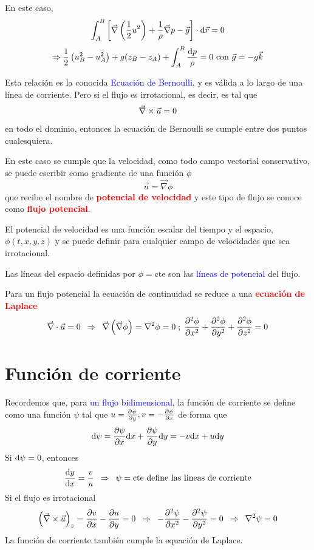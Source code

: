 	
	En este caso, 
	\[
	\int_{A}^{B}\left[\vec{\nabla}\left(\frac{1}{2}u^{2}\right)+\frac{1}{\rho}\vec{\nabla}p-\vec{g}\right]\cdot\text{d}\vec{r}=0
	\]
	\[
	\Rightarrow\frac{1}{2}\left(u_{B}^{2}-u_{A}^{2}\right)+g(z_{B}-z_{A})+\int_{A}^{B}\frac{\text{d} p}{\rho}=0\textrm{ con }\vec{g}=-g\vec{k}
	\]
	
	Esta relación es la conocida \textcolor{blue}{Ecuación de Bernoulli},
	y es válida a lo largo de una línea de corriente. Pero si el flujo
	es irrotacional, es decir, es tal que 
	\[
	\vec \nabla \times\vec{u}=0
	\]
	en todo el dominio, entonces la ecuación de Bernoulli se cumple entre
	dos puntos cualesquiera.

	
	En este caso se cumple que la velocidad, como todo campo vectorial
	conservativo, se puede escribir como gradiente de una función $\phi$
	\[
	\vec{u}=\vec{\nabla}\phi
	\]
	que recibe el nombre de \textbf{\textcolor{red}{potencial de velocidad}}
	y este tipo de flujo se conoce como \textbf{\textcolor{red}{flujo
			potencial}}.
	
	El potencial de velocidad es una función escalar del tiempo y el espacio,
	$\phi(t,x,y,z)$ y se puede definir para cualquier campo de velocidades
	que sea irrotacional.
	
	Las líneas del espacio definidas por $\phi=\text{cte}$ son las \textcolor{blue}{líneas
		de potencial} del flujo.
	
	Para un flujo potencial la ecuación de continuidad se reduce a una
	\textbf{\textcolor{red}{ecuación de Laplace}} 
	\[
	\vec{\nabla}\cdot\vec{u}=0\enskip\Rightarrow\enskip\vec{\nabla}\left(\vec{\nabla}\phi\right)=\nabla^{2}\phi=0\;;\;\frac{\partial^2 \phi}{\partial x^2}+\frac{\partial^2 \phi}{\partial y^2}+\frac{\partial^2 \phi}{\partial z^2}=0
	\]
	

\section{Función de corriente}

	
	Recordemos que, para \textcolor{blue}{un flujo bidimensional}, la
	función de corriente se define como una función $\psi$ tal que $u=\frac{\partial \psi}{\partial y},v=-\frac{\partial \psi}{\partial x}$
	de forma que 
	\[
	\text{d}\psi=\frac{\partial \psi}{\partial x}\text{d} x+\frac{\partial \psi}{\partial y}\text{d} y=-v\text{d} x+u\text{d} y
	\]
	Si $\text{d}\psi=0$, entonces 
	\[
	\frac{\textrm{d} y}{\textrm{d} x}=\frac{v}{u}\enskip\Rightarrow\enskip\psi=\text{cte define las lineas de corriente}
	\]
	Si el flujo es irrotacional 
	\[
	\left(\vec \nabla \times\vec{u}\right)_{z}=\frac{\partial v}{\partial x}-\frac{\partial u}{\partial y}=0\enskip\Rightarrow\enskip-\frac{\partial^2 \psi}{\partial x^2}-\frac{\partial^2 \psi}{\partial y^2}=0\enskip\Rightarrow\enskip\nabla^{2}\psi=0
	\]
	La función de corriente también cumple la equación de Laplace.

